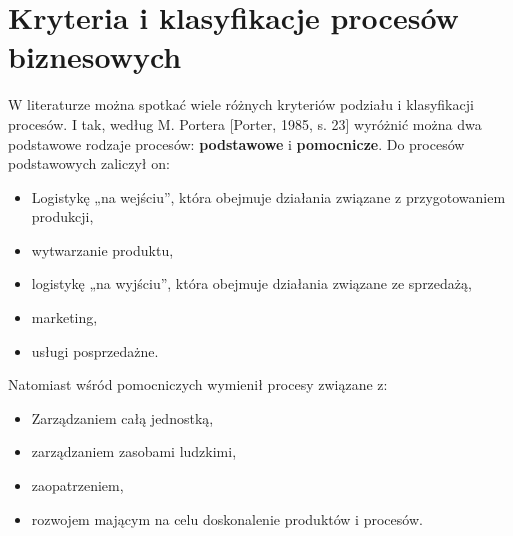\documentclass[a4paper, 12pt]{article}
\begin{document}
\section{Kryteria i klasyfikacje procesów biznesowych}
\hspace*{1 cm}W literaturze  można  spotkać  wiele  różnych  kryteriów  podziału  i klasyfikacji  procesów.  I  tak,  według  M.  Portera  [Porter,  1985,  s.  23]  wyróżnić  można  dwa  podstawowe  rodzaje  procesów:  \textbf{podstawowe}  i  \textbf{pomocnicze}. Do procesów podstawowych zaliczył on: 
\begin{itemize}
	\item Logistykę „na wejściu”, która obejmuje działania związane z przygotowaniem produkcji,
	\item wytwarzanie produktu, 
 	\item logistykę  „na  wyjściu”,  która obejmuje  działania związane ze sprzedażą,
	\item marketing,
	\item usługi posprzedażne.
\end{itemize}

\hspace*{1 cm}Natomiast wśród pomocniczych wymienił procesy związane z: 
\begin{itemize}
	\item Zarządzaniem całą jednostką,
	\item zarządzaniem zasobami ludzkimi,
	\item zaopatrzeniem,
	\item rozwojem mającym na celu doskonalenie produktów i procesów.
\end{itemize}
\end{document}

